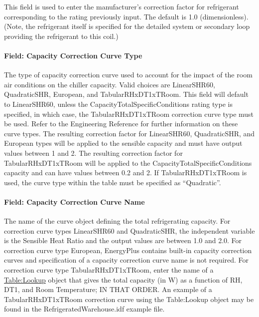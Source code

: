 This field is used to enter the manufacturer's correction factor for refrigerant corresponding to the rating previously input. The default is 1.0 (dimensionless). (Note, the refrigerant itself is specified for the detailed system or secondary loop providing the refrigerant to this coil.)

\paragraph{Field: Capacity Correction Curve Type}\label{field-capacity-correction-curve-type}

The type of capacity correction curve used to account for the impact of the room air conditions on the chiller capacity. Valid choices are LinearSHR60, QuadraticSHR, European, and TabularRHxDT1xTRoom. This field will default to LinearSHR60, unless the CapacityTotalSpecificConditions rating type is specified, in which case, the TabularRHxDT1xTRoom correction curve type must be used. Refer to the Engineering Reference for further information on these curve types. The resulting correction factor for LinearSHR60, QuadraticSHR, and European types will be applied to the sensible capacity and must have output values between 1 and 2. The resulting correction factor for TabularRHxDT1xTRoom will be applied to the CapacityTotalSpecificConditions capacity and can have values between 0.2 and 2. If TabularRHxDT1xTRoom is used, the curve type within the table must be specified as ``Quadratic''.

\paragraph{Field: Capacity Correction Curve Name}\label{field-capacity-correction-curve-name}

The name of the curve object defining the total refrigerating capacity. For correction curve types LinearSHR60 and QuadraticSHR, the independent variable is the Sensible Heat Ratio and the output values are between 1.0 and 2.0. For correction curve type European, EnergyPlus contains built-in capacity correction curves and specification of a capacity correction curve name is not required. For correction curve type TabularRHxDT1xTRoom, enter the name of a \hyperref[tablelookup]{Table:Lookup} object that gives the total capacity (in W) as a function of RH, DT1, and Room Temperature; IN THAT ORDER. An example of a TabularRHxDT1xTRoom correction curve using the Table:Lookup object may be found in the RefrigeratedWarehouse.idf example file.

